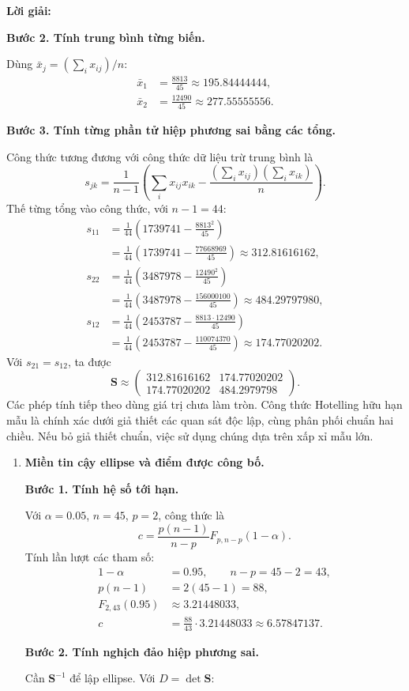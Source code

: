 \documentclass[11pt,a4paper]{article}
\newenvironment{solution}{%
  \par\medskip\noindent\textbf{Lời giải:}\par\nobreak\smallskip\noindent\ignorespaces
}{\par}
\newcommand{\step}[2]{\par\medskip\noindent\textbf{Bước #1. #2}\par\nopagebreak[4]\smallskip\noindent}
\begin{document}
\begin{solution}
\step{2}{Tính trung bình từng biến.}
Dùng $\bar{x}_j=(\sum_i x_{ij})/n$:
\begin{align*}
\bar{x}_1&=\frac{8813}{45}\approx195.84444444,\\
\bar{x}_2&=\frac{12490}{45}\approx277.55555556.
\end{align*}
\step{3}{Tính từng phần tử hiệp phương sai bằng các tổng.}
Công thức tương đương với công thức dữ liệu trừ trung bình là
\[
s_{jk}=\frac1{n-1}\left(\sum_i x_{ij}x_{ik}
-\frac{(\sum_i x_{ij})(\sum_i x_{ik})}n\right).
\]
Thế từng tổng vào công thức, với $n-1=44$:
\begin{align*}
s_{11}&=\frac1{44}\left(1739741-\frac{8813^2}{45}\right)\\
&=\frac1{44}\left(1739741-\frac{77668969}{45}\right)
\approx312.81616162,\\
s_{22}&=\frac1{44}\left(3487978-\frac{12490^2}{45}\right)\\
&=\frac1{44}\left(3487978-\frac{156000100}{45}\right)
\approx484.29797980,\\
s_{12}&=\frac1{44}\left(2453787-\frac{8813\cdot12490}{45}\right)\\
&=\frac1{44}\left(2453787-\frac{110074370}{45}\right)
\approx174.77020202.
\end{align*}
Với $s_{21}=s_{12}$, ta được
\[
\mathbf{S}\approx\begin{pmatrix}312.81616162&174.77020202\\174.77020202&484.2979798\end{pmatrix}.
\]
Các phép tính tiếp theo dùng giá trị chưa làm tròn.
Công thức Hotelling hữu hạn mẫu là chính xác dưới giả thiết các quan sát
độc lập, cùng phân phối chuẩn hai chiều. Nếu bỏ giả thiết chuẩn,
việc sử dụng chúng dựa trên xấp xỉ mẫu lớn.
\begin{enumerate}[label=\textbf{\alph*)}]
\item \textbf{Miền tin cậy ellipse và điểm được công bố.}\par\nopagebreak[4]
\step{1}{Tính hệ số tới hạn.}
Với $\alpha=0.05$, $n=45$, $p=2$, công thức là
\[
c=\frac{p(n-1)}{n-p}F_{p,n-p}(1-\alpha).
\]
Tính lần lượt các tham số:
\begin{align*}
1-\alpha&=0.95,\qquad n-p=45-2=43,\\
p(n-1)&=2(45-1)=88,\\
F_{2,43}(0.95)&\approx3.21448033,\\
c&=\frac{88}{43}\cdot3.21448033
\approx6.57847137.
\end{align*}
\step{2}{Tính nghịch đảo hiệp phương sai.}
Cần $\mathbf{S}^{-1}$ để lập ellipse. Với $D=\det\mathbf{S}$:

\end{enumerate}
\end{solution}
\end{document}
